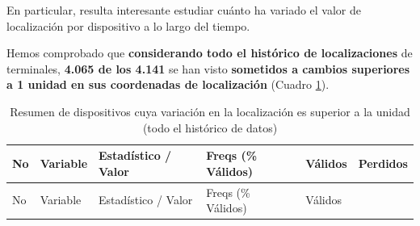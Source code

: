\documentclass[]{book}
\begin{document}
En particular, resulta interesante estudiar cuánto ha variado el valor
de localización por dispositivo a lo largo del tiempo.

Hemos comprobado que \textbf{considerando todo el histórico de
localizaciones} de terminales, \textbf{4.065 de los 4.141} se han visto
\textbf{sometidos a cambios superiores a 1 unidad en sus coordenadas de
localización} (Cuadro \ref{tabs:all-locations-diff-summary}).

\begin{longtable}[]{@{}llllll@{}}
\caption{\label{tabs:all-locations-diff-summary}Resumen de dispositivos
cuya variación en la localización es superior a la unidad (todo el
histórico de datos)}\tabularnewline
\toprule
\begin{minipage}[b]{0.05\columnwidth}\raggedright\strut
No\strut
\end{minipage} & \begin{minipage}[b]{0.11\columnwidth}\raggedright\strut
Variable\strut
\end{minipage} & \begin{minipage}[b]{0.28\columnwidth}\raggedright\strut
Estadístico / Valor\strut
\end{minipage} & \begin{minipage}[b]{0.21\columnwidth}\raggedright\strut
Freqs (\% Válidos)\strut
\end{minipage} & \begin{minipage}[b]{0.08\columnwidth}\raggedright\strut
Válidos\strut
\end{minipage} & \begin{minipage}[b]{0.08\columnwidth}\raggedright\strut
Perdidos\strut
\end{minipage}\tabularnewline
\midrule
\endfirsthead
\toprule
\begin{minipage}[b]{0.05\columnwidth}\raggedright\strut
No\strut
\end{minipage} & \begin{minipage}[b]{0.11\columnwidth}\raggedright\strut
Variable\strut
\end{minipage} & \begin{minipage}[b]{0.28\columnwidth}\raggedright\strut
Estadístico / Valor\strut
\end{minipage} & \begin{minipage}[b]{0.21\columnwidth}\raggedright\strut
Freqs (\% Válidos)\strut
\end{minipage} & \begin{minipage}[b]{0.08\columnwidth}\raggedright\strut
Válidos\strut
\end{minipage} & \begin{minipage}[b]{0.08\columnwidth}\raggedright\strut

\end{minipage}
\end{longtable}
\end{document}
